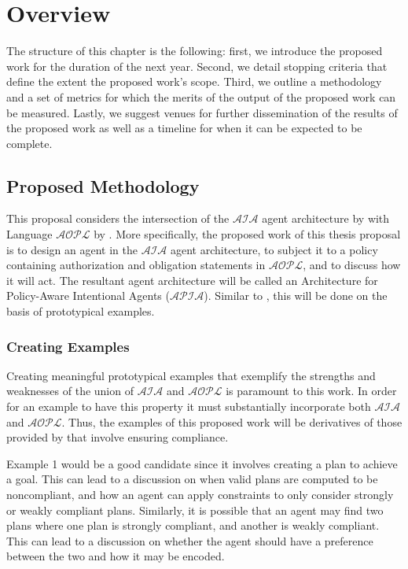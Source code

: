 \chapter{Overview}


The structure of this chapter is the following: first, we introduce the proposed work for the duration of the next year.
Second, we detail stopping criteria that define the extent the proposed work's scope.
Third, we outline a methodology and a set of metrics for which the merits of the output of the proposed work can be measured.
Lastly, we suggest venues for further dissemination of the results of the proposed work as well as a timeline for when it can be expected to be complete.

\section{Proposed Methodology}

This proposal considers the intersection of the $\mathcal{AIA}$ agent architecture by \citet{blount_towards_2014} with Language $\mathcal{AOPL}$ by \citet{gelfond_authorization_2008}.
More specifically, the proposed work of this thesis proposal is to design an agent in the $\mathcal{AIA}$ agent architecture, to subject it to a policy containing authorization and obligation statements in $\mathcal{AOPL}$, and to discuss how it will act.
The resultant agent architecture will be called an Architecture for Policy-Aware Intentional Agents ($\mathcal{APIA}$).
Similar to \citet{blount_towards_2014}, this will be done on the basis of prototypical examples.

\subsection{Creating Examples}

Creating meaningful prototypical examples that exemplify the strengths and weaknesses of the union of $\mathcal{AIA}$ and $\mathcal{AOPL}$ is paramount to this work.
In order for an example to have this property it must substantially incorporate both $\mathcal{AIA}$ and $\mathcal{AOPL}$.
Thus, the examples of this proposed work will be derivatives of those provided by \citet{blount_towards_2014} that involve ensuring compliance.

Example 1 would be a good candidate since it involves creating a plan to achieve a goal.
This can lead to a discussion on when valid plans are computed to be noncompliant, and how an agent can apply constraints to only consider strongly or weakly compliant plans.
Similarly, it is possible that an agent may find two plans where one plan is strongly compliant, and another is weakly compliant.
This can lead to a discussion on whether the agent should have a preference between the two and how it may be encoded.


